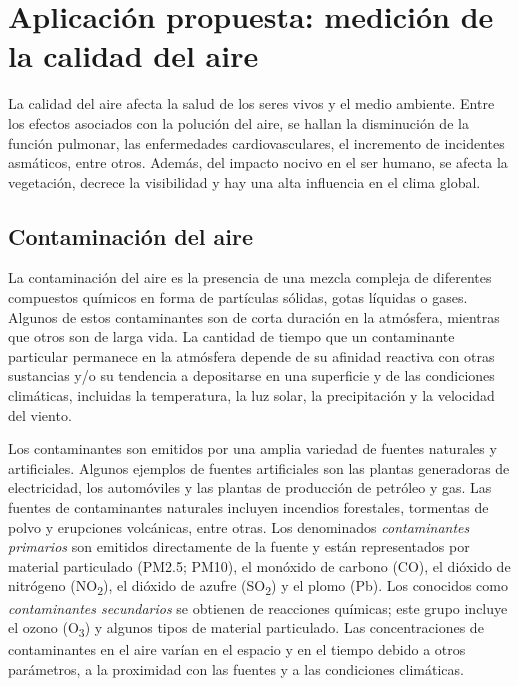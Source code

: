 \chapter[Aplicación propuesta]{Aplicación propuesta: medición de la calidad del aire} \label{cap:aplicacion}

La calidad del aire afecta la salud de los seres vivos y el medio ambiente. Entre los efectos asociados con la polución del aire, se hallan la disminución de la función pulmonar, las enfermedades cardiovasculares, el incremento de incidentes asmáticos, entre otros. Además, del impacto nocivo en el ser humano, se afecta la vegetación, decrece la visibilidad y hay una alta influencia en el clima global.

\section{Contaminación del aire}

La contaminación del aire es la presencia de una mezcla compleja de diferentes compuestos químicos en forma de partículas sólidas, gotas líquidas o gases. Algunos de estos contaminantes son de corta duración en la atmósfera, mientras que otros son de larga vida. La cantidad de tiempo que un contaminante particular permanece en la atmósfera depende de su afinidad reactiva con otras sustancias y/o su tendencia a depositarse en una superficie y de las condiciones climáticas, incluidas la temperatura, la luz solar, la precipitación y la velocidad del viento.

Los contaminantes son emitidos por una amplia variedad de fuentes naturales y artificiales. Algunos ejemplos de fuentes artificiales son las plantas generadoras de electricidad, los automóviles y las plantas de producción de petróleo y gas. Las fuentes de contaminantes naturales incluyen incendios forestales, tormentas de polvo y erupciones volcánicas, entre otras. Los denominados \emph{contaminantes primarios} son emitidos directamente de la fuente y están representados por material particulado (PM2.5; PM10), el monóxido de carbono (CO), el dióxido de nitrógeno (NO\textsubscript{2}), el dióxido de azufre (SO\textsubscript{2}) y el plomo (Pb). Los conocidos como \emph{contaminantes secundarios} se obtienen de reacciones químicas; este grupo incluye el ozono (O\textsubscript{3}) y algunos tipos de material particulado. Las concentraciones de contaminantes en el aire varían en el espacio y en el tiempo debido a otros parámetros, a la proximidad con las fuentes y a las condiciones climáticas.

